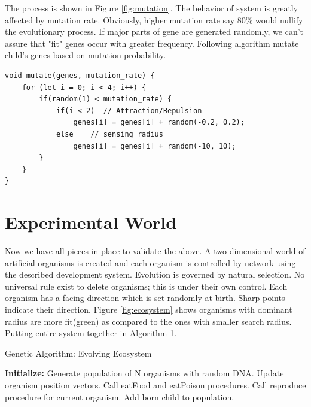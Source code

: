 \documentclass[conference]{IEEEtran}
\begin{document}
The process is shown in Figure \ref{fig:mutation}. The behavior of system is greatly affected by mutation rate. Obviously, higher mutation rate say 80\% would nullify the evolutionary process. If major parts of gene are generated randomly, we can't assure that "fit" genes occur with greater frequency. Following algorithm mutate child's genes based on mutation probability.
\begin{lstlisting}[caption=Mutating genes array based on mutation rate]
void mutate(genes, mutation_rate) {
	for (let i = 0; i < 4; i++) {
		if(random(1) < mutation_rate) {
			if(i < 2)  // Attraction/Repulsion
				genes[i] = genes[i] + random(-0.2, 0.2);
			else 	// sensing radius
				genes[i] = genes[i] + random(-10, 10);
		}
	}
}
\end{lstlisting}
\section{Experimental World}
Now we have all pieces in place to validate the above. A two dimensional world of artificial organisms is created and each organism is controlled by network using the described development system. Evolution is governed by natural selection. No universal rule exist to delete organisms; this is under their own control. Each organism has a facing direction which is set randomly at birth. Sharp points indicate their direction. Figure \ref{fig:ecosystem} shows organisms with dominant radius are more fit(green) as compared to the ones with smaller search radius. Putting entire system together in Algorithm 1.
\begin{algorithm}
\caption{Genetic Algorithm: Evolving Ecosystem}
\begin{algorithmic} 
\STATE \textbf{Initialize:} Generate population of N organisms with random DNA.
\LOOP
{}                    
\STATE Update organism position vectors.
\STATE Call eatFood and eatPoison procedures.
\STATE Call reproduce procedure for current organism.
\STATE Add born child to population.
\ENDIF
\ENDFOR
\ENDLOOP
\end{algorithmic}
\end{algorithm}
\end{document}
